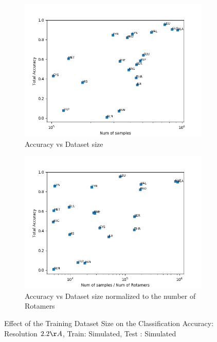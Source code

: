 \begin{figure}[!ht]
\begin{minipage}[b]{0.45\linewidth}
\begin{subfigure}[b]{\linewidth}
	\includegraphics[width=1.1\textwidth]{pics/DS_22_SS}
	\caption{Accuracy vs Dataset size \newline \newline}
	\label{f:DS_22_SS}
\end{subfigure}
\end{minipage}
\begin{minipage}[b]{0.45\linewidth}
\begin{subfigure}[b]{\linewidth}
	\includegraphics[width=1.1\textwidth]{pics/DS_norm_22_SS.png}
	\caption{Accuracy vs Dataset size normalized to the number of Rotamers}
	\label{f:DS_norm_22_SS}
\end{subfigure}
\end{minipage}
\caption{Effect of the Training Dataset Size on the Classification Accuracy: Resolution $2.2 \AA$,  Train: Simulated, Test : Simulated}
\end{figure}


